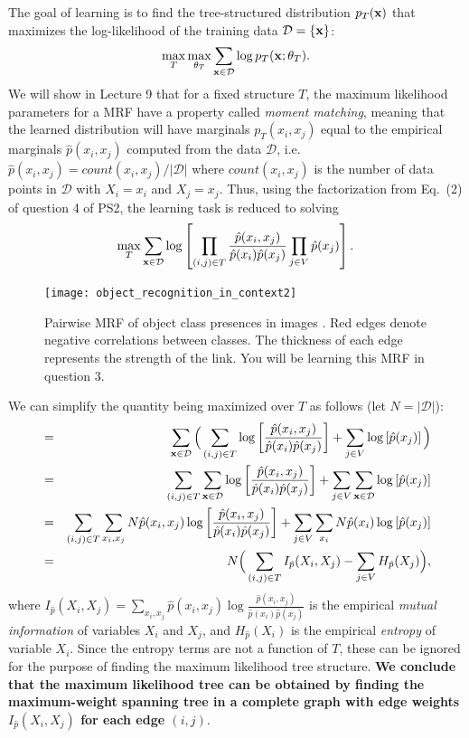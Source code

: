 \documentclass{article}
\begin{document}
\begin{enumerate}
The goal of learning is to find the tree-structured distribution $p_T({\bf x})$ that maximizes the log-likelihood of the training data $\mathcal{D}=\{ {\bf x} \}$:
$$
\max_T \max_{\theta_T} \sum_{{\bf x}\in \mathcal{D}} \log p_T({\bf x}; \theta_T).
$$
We will show in Lecture 9 that for a fixed structure $T$, the maximum
likelihood parameters for a MRF have a property called {\em moment
  matching}, meaning that the learned distribution will have marginals
$p_T(x_i,x_j)$ equal to the empirical marginals $\hat{p}(x_i,x_j)$
computed from the data $\mathcal{D}$, i.e. $\hat{p}(x_i,x_j) =
count(x_i,x_j)/|\mathcal{D}|$ where $count(x_i,x_j)$ is the number of
data points in $\mathcal{D}$ with $X_i=x_i$ and $X_j=x_j$. Thus, using
the factorization from Eq.~(2) of question 4 of PS2, the learning task is reduced to solving
$$
\max_T \sum_{{\bf x}\in \mathcal{D}} \log\left[
\prod_{(i,j)\in T}\frac{\hat{p}(x_i,x_j)}{\hat{p}(x_i)\hat{p}(x_j)}\prod_{j\in V} \hat{p}(x_j)
\right].
$$
\begin{figure}[t]
\centering
\texttt{[image: object\_recognition\_in\_context2]}
\vspace{-8mm}
\caption{Pairwise MRF of object class presences in images \cite{choi_cvpr10}. Red edges denote negative correlations between classes. The thickness of each edge represents the strength of the link. You will be learning this MRF in question 3.\label{fig:object_rec2}}
\end{figure}
We can simplify the quantity being maximized over $T$ as follows (let $N=|\mathcal{D}|$):
\begin{eqnarray*}
&=&\sum_{{\bf x}\in \mathcal{D}} \Big(
\sum_{(i,j)\in T}\log\left[\frac{\hat{p}(x_i,x_j)}{\hat{p}(x_i)\hat{p}(x_j)}\right] + \sum_{j\in V}\log\left[ \hat{p}(x_j)\right]\Big)  \\
&=&\sum_{(i,j)\in T}\sum_{{\bf x}\in \mathcal{D}} \log\left[\frac{\hat{p}(x_i,x_j)}{\hat{p}(x_i)\hat{p}(x_j)}\right] + \sum_{j\in V}\sum_{{\bf x}\in \mathcal{D}}\log\left[ \hat{p}(x_j)\right]  \\
&=&\sum_{(i,j)\in T}\sum_{x_i, x_j}N\hat{p}(x_i, x_j) \log\left[\frac{\hat{p}(x_i,x_j)}{\hat{p}(x_i)\hat{p}(x_j)}\right] + \sum_{j\in V} \sum_{x_i}N\hat{p}(x_i) \log\left[ \hat{p}(x_j)\right]  \\
&=& N\Big(\sum_{(i,j)\in T} I_{\hat{p}}(X_i, X_j) - \sum_{j\in V} H_{\hat{p}}(X_j)\Big),
\end{eqnarray*}
where $I_{\hat{p}}(X_i,X_j)=\sum_{x_i,x_j} \hat{p}(x_i,x_j)\log\frac{\hat{p}(x_i,x_j)}{\hat{p}(x_i)\hat{p}(x_j)}$ is the empirical {\em mutual information} of variables $X_i$ and $X_j$, and $H_{\hat{p}}(X_i)$ is the empirical {\em entropy} of variable $X_i$. Since the entropy terms are not a function of $T$, these can be ignored for the purpose of finding the maximum likelihood tree structure. {\bf We conclude that the maximum likelihood tree can be obtained by finding the maximum-weight spanning tree in a complete graph with edge weights $I_{\hat{p}}(X_i,X_j)$ for each edge $(i,j)$}.


\end{enumerate}
\end{document}
